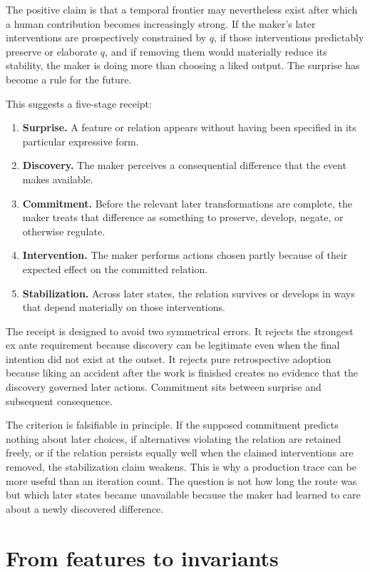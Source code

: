 \documentclass[11pt]{article}
\begin{document}
The positive claim is that a temporal frontier may nevertheless exist after which a human contribution becomes increasingly strong. If the maker's later interventions are prospectively constrained by $q$, if those interventions predictably preserve or elaborate $q$, and if removing them would materially reduce its stability, the maker is doing more than choosing a liked output. The surprise has become a rule for the future.

This suggests a five-stage receipt:

\begin{enumerate}
\item \textbf{Surprise.} A feature or relation appears without having been specified in its particular expressive form.
\item \textbf{Discovery.} The maker perceives a consequential difference that the event makes available.
\item \textbf{Commitment.} Before the relevant later transformations are complete, the maker treats that difference as something to preserve, develop, negate, or otherwise regulate.
\item \textbf{Intervention.} The maker performs actions chosen partly because of their expected effect on the committed relation.
\item \textbf{Stabilization.} Across later states, the relation survives or develops in ways that depend materially on those interventions.
\end{enumerate}

The receipt is designed to avoid two symmetrical errors. It rejects the strongest ex ante requirement because discovery can be legitimate even when the final intention did not exist at the outset. It rejects pure retrospective adoption because liking an accident after the work is finished creates no evidence that the discovery governed later actions. Commitment sits between surprise and subsequent consequence.

The criterion is falsifiable in principle. If the supposed commitment predicts nothing about later choices, if alternatives violating the relation are retained freely, or if the relation persists equally well when the claimed interventions are removed, the stabilization claim weakens. This is why a production trace can be more useful than an iteration count. The question is not how long the route was but which later states became unavailable because the maker had learned to care about a newly discovered difference.

\section{From features to invariants}
\end{document}
